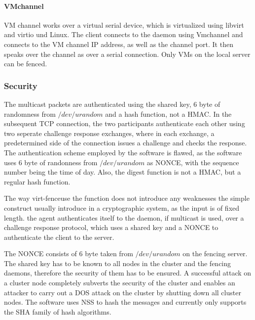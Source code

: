 \paragraph{VMchannel}
VM channel works over a virtual serial device, which is virtualized using libvirt and
virtio und Linux.
The client connects to the daemon using Vmchannel and connects to the VM channel IP address,
as well as the channel port. It then speaks over the channel as over a serial connection.
Only \acp{VM} on the local server can be fenced.
\subsubsection{Security}
The multicast packets are authenticated using the shared key, 6 byte of
randomness from $/dev/urandom$ and a hash function, not a \ac{HMAC}.
In the subsequent \ac{TCP} connection, the two participants authenticate each other using
two seperate challenge response exchanges, where in each exchange, a predetermined
side of the connection issues a challenge and checks the response.
The authentication scheme employed by the software is flawed, as
the software uses 6 byte of randonness from $/dev/urandom$ as \ac{NONCE},
with the sequence number being the time of day. Also, the digest function
is not a \ac{HMAC}, but a regular hash function.

The way virt-fenceuse the function does not introduce any weaknesses the simple construct
usually introduce in a cryptographic system, as the input is of fixed length.
the agent authenticates itself to the daemon, if multicast is used,
over a challenge response protocol, which uses a shared key and a \ac{NONCE}
to authenticate the client to the server. 

The \ac{NONCE} consists of 6 byte taken from $/dev/urandom$
on the fencing server. The shared key has to be known to
all nodes in the cluster and the fencing daemons, therefore the
security of them has to be ensured. A successful attack on a cluster node
completely subverts the security of the cluster and enables an
attacker to carry out a DOS attack on the cluster by shutting down
all cluster nodes. The software uses \ac{NSS} to hash the messages
and currently only supports the \ac{SHA} family of hash algorithms.


